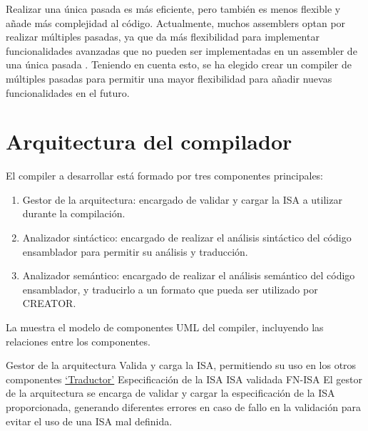 Realizar una única pasada es más eficiente, pero también es menos flexible y
añade más complejidad al código. Actualmente, muchos \glspl{assembler} optan por
realizar múltiples pasadas, ya que da más flexibilidad para implementar
funcionalidades avanzadas que no pueden ser implementadas en un \gls{assembler}
de una única pasada \parencite{assembler-design}. Teniendo en cuenta esto, se ha
elegido crear un \gls{compiler} de múltiples pasadas para permitir una mayor
flexibilidad para añadir nuevas funcionalidades en el futuro.

\section{Arquitectura del compilador}\label{sec:architecture}

\noindent
El \gls{compiler} a desarrollar está formado por tres componentes principales:

\begin{enumerate}
    \item Gestor de la arquitectura: encargado de validar y cargar la \gls{ISA}
    a utilizar durante la compilación.
    \item Analizador sintáctico: encargado de realizar el análisis sintáctico del
    código ensamblador para permitir su análisis y traducción.
    \item Analizador semántico: encargado de realizar el análisis semántico del
    código ensamblador, y traducirlo a un formato que pueda ser utilizado por
    CREATOR.
\end{enumerate}

La  muestra el modelo de componentes UML
\parencite{UMLSpec} del \gls{compiler}, incluyendo las relaciones entre los
componentes.


\printcomptemplate

\newcommand{\componentref}[1]{\hyperref[req:#1]{`#1'}}

\begin{component}{Gestor de la arquitectura}
    {Valida y carga la \gls{ISA}, permitiendo su uso en los otros componentes} %
    {\componentref{Traductor}} %
    {Especificación de la \gls{ISA}} %
    {\gls{ISA} validada} %
    {FN-ISA} %
    El gestor de la arquitectura se encarga de validar y cargar la
    especificación de la \gls{ISA} proporcionada, generando diferentes errores
    en caso de fallo en la validación para evitar el uso de una \gls{ISA} mal
    definida.
\end{component}

